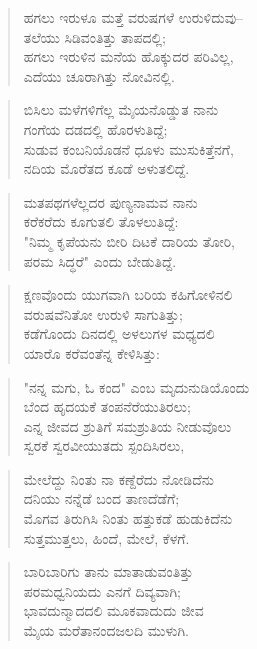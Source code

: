 \begin{verse}
ಹಗಲು ಇರುಳೂ ಮತ್ತೆ ವರುಷಗಳೆ ಉರುಳಿದುವು–\\ತಲೆಯು ಸಿಡಿವಂತಿತ್ತು ತಾಪದಲ್ಲಿ; \\ಹಗಲು ಇರುಳಿನ ಮನೆಯ ಹೊಕ್ಕುದರ ಪರಿವಿಲ್ಲ,\\ಎದೆಯು ಚೂರಾಗಿತ್ತು ನೋವಿನಲ್ಲಿ.
\end{verse}

\begin{verse}
ಬಿಸಿಲು ಮಳೆಗಳಿಗೆಲ್ಲ ಮೈಯನೊಡ್ಡುತ ನಾನು\\ಗಂಗೆಯ ದಡದಲ್ಲಿ ಹೊರಳುತಿದ್ದೆ;\\ಸುಡುವ ಕಂಬನಿಯೊಡನೆ ಧೂಳು ಮುಸುಕಿತ್ತೆನಗೆ,\\ನದಿಯ ಮೊರೆತದ ಕೂಡೆ ಅಳುತಲಿದ್ದೆ.
\end{verse}

\begin{verse}
ಮತಪಥಗಳೆಲ್ಲದರ ಪುಣ್ಯನಾಮವ ನಾನು\\ಕರೆಕರೆದು ಕೂಗುತಲಿ ತೊಳಲುತಿದ್ದೆ:\\"ನಿಮ್ಮ ಕೃಪೆಯನು ಬೀರಿ ದಿಟಕೆ ದಾರಿಯ ತೋರಿ,\\ಪರಮ ಸಿದ್ಧರೆ" ಎಂದು ಬೇಡುತಿದ್ದೆ. 
\end{verse}

\begin{verse}
ಕ್ಷಣವೊಂದು ಯುಗವಾಗಿ ಬರಿಯ ಕಹಿಗೋಳಿನಲಿ\\ವರುಷವೆನಿತೋ ಉರುಳಿ ಸಾಗುತಿತ್ತು;\\ಕಡೆಗೊಂದು ದಿನದಲ್ಲಿ ಅಳಲುಗಳ ಮಧ್ಯದಲಿ\\ಯಾರೊ ಕರೆವಂತೆನ್ನ ಕೇಳಿಸಿತ್ತು:
\end{verse}

\begin{verse}
"ನನ್ನ ಮಗು, ಓ ಕಂದ" ಎಂಬ ಮೃದುನುಡಿಯೊಂದು\\ಬೆಂದ ಹೃದಯಕೆ ತಂಪನೆರೆಯುತಿರಲು;\\ಎನ್ನ ಜೀವದ ಶ್ರುತಿಗೆ ಸಮಶ್ರುತಿಯ ನೀಡುವೊಲು\\ಸ್ವರಕೆ ಸ್ವರವೀಯುತದು ಸ್ಪಂದಿಸಿರಲು,
\end{verse}

\begin{verse}
ಮೇಲೆದ್ದು ನಿಂತು ನಾ ಕಣ್ದೆರೆದು ನೋಡಿದೆನು\\ದನಿಯು ನನ್ನೆಡೆ ಬಂದ ತಾಣದೆಡೆಗೆ; \\ಮೊಗವ ತಿರುಗಿಸಿ ನಿಂತು ಹತ್ತುಕಡೆ ಹುಡುಕಿದೆನು\\ಸುತ್ತಮುತ್ತಲು, ಹಿಂದೆ, ಮೇಲೆ, ಕೆಳಗೆ.
\end{verse}

\begin{verse}
ಬಾರಿಬಾರಿಗು ತಾನು ಮಾತಾಡುವಂತಿತ್ತು\\ಪರಮಧ್ವನಿಯದು ಎನಗೆ ದಿವ್ಯವಾಗಿ;\\ಭಾವದುನ್ಮಾದದಲಿ ಮೂಕವಾದುದು ಜೀವ\\ಮೈಯ ಮರೆತಾನಂದಜಲದಿ ಮುಳುಗಿ.
\end{verse}

